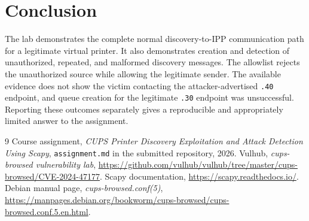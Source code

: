 \documentclass[11pt,a4paper]{article}
\begin{document}
\section{Conclusion}
The lab demonstrates the complete normal discovery-to-IPP communication path for a legitimate virtual printer. It also demonstrates creation and detection of unauthorized, repeated, and malformed discovery messages. The allowlist rejects the unauthorized source while allowing the legitimate sender. The available evidence does not show the victim contacting the attacker-advertised \texttt{.40} endpoint, and queue creation for the legitimate \texttt{.30} endpoint was unsuccessful. Reporting these outcomes separately gives a reproducible and appropriately limited answer to the assignment.

\begin{thebibliography}{9}
 Course assignment, \emph{CUPS Printer Discovery Exploitation and Attack Detection Using Scapy}, \texttt{assignment.md} in the submitted repository, 2026.
 Vulhub, \emph{cups-browsed vulnerability lab}, \url{https://github.com/vulhub/vulhub/tree/master/cups-browsed/CVE-2024-47177}.
 Scapy documentation, \url{https://scapy.readthedocs.io/}.
 Debian manual page, \emph{cups-browsed.conf(5)}, \url{https://manpages.debian.org/bookworm/cups-browsed/cups-browsed.conf.5.en.html}.
\end{thebibliography}
\end{document}
